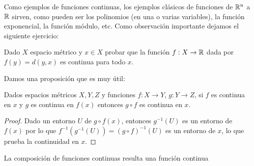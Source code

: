 \documentclass[12pt,a4paper]{book}
\begin{document}
Como ejemplos de funciones continuas, los ejemplos clásicos de funciones de $\mathbb{R}^n$ a $\mathbb{R}$ sirven, como pueden ser los polinomios (en una o varias variables), la función exponencial, la función módulo, etc.
Como observación importante dejamos el siguiente ejercicio:
\begin{ej}
Dado $X$ espacio métrico y $x \in X$ probar que la función $f:X \rightarrow \mathbb{R}$ dada por $f(y)=d(y,x)$ es continua para todo $x$.
\end{ej}
Damos una proposición que es muy útil:
\begin{prop}
Dados espacios métricos $X,Y,Z$ y funciones $f:X \rightarrow Y$, $g:Y \rightarrow Z$, si $f$ es continua en $x$ y $g$ es continua en $f(x)$ entonces $g \circ f$ es continua en $x$.
\begin{proof} Dado un entorno $U$ de $g\circ f(x)$, entonces $g^{-1}(U)$ es un entorno de $f(x)$ por lo que $f^{-1}(g^{-1}(U))=(g \circ f)^{-1}(U)$ es un entorno de $x$, lo que prueba la continuidad en $x$.
\end{proof}
\end{prop}
\begin{cor} La composición de funciones continuas resulta una función continua
\end{cor}
\end{document}
